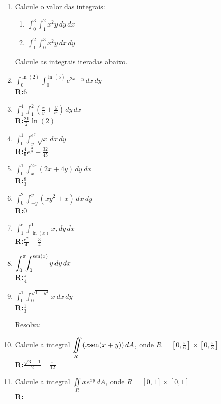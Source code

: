 \documentclass[oneside,a4paper,12pt]{article}
\newcommand{\sen}{{\rm sen}}
\newcommand{\R}{\\{\bf R:}}
\newcommand{\iintR}{\displaystyle \iint \limits_R}
\begin{document}
\begin{enumerate}
	
	\item Calcule o valor das integrais:
	\begin{multicols}{2}
		\begin{enumerate}
			\item $\displaystyle \int_{0}^{3}\!\!\!\int_{1}^{2}x^2y \,dy\,dx$
			\item $\displaystyle \int_{1}^{2}\!\!\!\int_{0}^{3}x^2y \,dx\,dy$
		\end{enumerate}
	\end{multicols}

	Calcule as integrais iteradas abaixo.
	\item $\displaystyle \int_{0}^{\ln(2)}\!\!\int_{0}^{\ln(5)}e^{2x-y}\,dx\,dy$ \R 6
	
	\item $\displaystyle \int_{1}^{4}\!\!\int_{1}^{2}\left(\frac{x}{y}+\frac{y}{x}\right)\,dy\,dx$ \R $\displaystyle \frac{21}{2}\ln(2)$
	
	\item $\displaystyle \int_{0}^{1}\!\!\int_{y}^{e^y}\sqrt{x}\,dx\,dy$ \R $\displaystyle \frac{4}{9}e^{\frac{3}{2}}-\frac{32}{45}$
	
	\item $\displaystyle \int_{0}^{1}\!\!\int_{x}^{2x}\left(2x+4y\right)\,dy\,dx$ \R $\displaystyle \frac{8}{3}$
	
	\item $\displaystyle \int_{0}^{2}\!\!\int_{-y}^{y}\left(xy^2+x\right)\,dx\,dy$ \R $0$
	
	\item $\displaystyle \int_{1}^{e}\!\!\int_{\ln(x)}^{1}x,dy\,dx$ \R $\displaystyle \frac{e^2}{4}-\frac{3}{4}$
	
	\item $\displaystyle \int_{0}^{\pi}\!\!\int_{0}^{\sen(x)}y\,dy\,dx$ \R $\displaystyle \frac{\pi}{4}$
	
	\item $\displaystyle \int_{0}^{1}\!\!\int_{0}^{\sqrt{1-y^2}}x\,dx\,dy$ \R $\displaystyle \frac{1}{3}$
	
	Resolva:
	
	\item Calcule a integral $\iintR(x\sen(x+y))\,dA$, onde $R=\left[0,\displaystyle\frac{\pi}{6}\right]\times\left[0,\displaystyle\frac{\pi}{3}\right]$\R $\displaystyle \frac{\sqrt{3}-1}{2}-\frac{\pi}{12}$
	
	\item Calcule a integral $\iintR xe^{xy}\,dA$, onde $R=\left[0,1\right]\times\left[0,1\right]$\R 
	

\end{enumerate}
\end{document}
